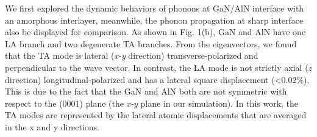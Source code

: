 \documentclass{article}
\begin{document}
We first explored the dynamic behaviors of phonons at GaN/AlN interface with an amorphous interlayer, meanwhile, the phonon propagation at sharp interface also be displayed for comparison. As shown in Fig. 1(b), GaN and AlN have one LA branch and two degenerate TA branches. From the eigenvectors, we found that the TA mode is lateral (\textit{x-y} direction) transverse-polarized and perpendicular to the wave vector. In contrast, the LA mode is not strictly axial (\textit{z} direction) longitudinal-polarized and has a lateral square displacement (<0.02$\%$). This is due to the fact that the GaN and AlN both are not symmetric with respect to the (0001) plane (the \textit{x-y} plane in our simulation). In this work, the TA modes are represented by the lateral atomic displacements that are averaged in the x and y directions. 
\end{document}
